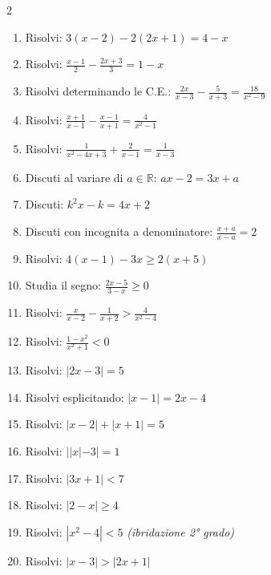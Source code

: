 \begin{multicols}{2}
\begin{enumerate}
    \item {} Risolvi: $3(x - 2) - 2(2x + 1) = 4 - x$
    \item {} Risolvi: $\frac{x-1}{2} - \frac{2x+3}{3} = 1 - x$
    \item {} Risolvi determinando le C.E.: $\frac{2x}{x-3} - \frac{5}{x+3} = \frac{18}{x^2-9}$
    \item {} Risolvi: $\frac{x+1}{x-1} - \frac{x-1}{x+1} = \frac{4}{x^2-1}$
    \item {} Risolvi: $\frac{1}{x^2-4x+3} + \frac{2}{x-1} = \frac{1}{x-3}$
    \item {} Discuti al variare di $a \in \mathbb{R}$: $ax - 2 = 3x + a$
    \item {} Discuti: $k^2x - k = 4x + 2$
    \item {} Discuti con incognita a denominatore: $\frac{x+a}{x-a} = 2$
    \item {} Risolvi: $4(x-1) - 3x \ge 2(x+5)$
    \item {} Studia il segno: $\frac{2x-5}{3-x} \ge 0$
    \item {} Risolvi: $\frac{x}{x-2} - \frac{1}{x+2} > \frac{4}{x^2-4}$
    \item {} Risolvi: $\frac{1-x^2}{x^2+1} < 0$
    \item {} Risolvi: $|2x - 3| = 5$
    \item {} Risolvi esplicitando: $|x - 1| = 2x - 4$
    \item {} Risolvi: $|x - 2| + |x + 1| = 5$
    \item {} Risolvi: $||x| - 3| = 1$
    \item {} Risolvi: $|3x + 1| < 7$
    \item {} Risolvi: $|2 - x| \ge 4$
    \item {} Risolvi: $|x^2 - 4| < 5$ \textit{(ibridazione 2° grado)}
    \item {} Risolvi: $|x - 3| > |2x + 1|$
\end{enumerate}
\end{multicols}

